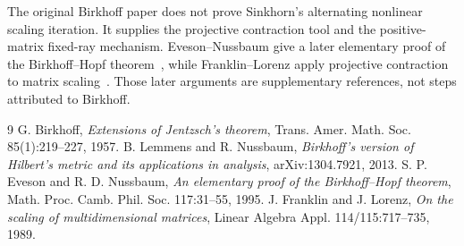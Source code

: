 \documentclass[11pt]{article}
\begin{document}
The original Birkhoff paper does not prove Sinkhorn's alternating nonlinear scaling iteration.  It supplies the projective contraction tool and the positive-matrix fixed-ray mechanism.  Eveson--Nussbaum give a later elementary proof of the Birkhoff--Hopf theorem~\cite{EvesonNussbaum1995}, while Franklin--Lorenz apply projective contraction to matrix scaling~\cite{FranklinLorenz1989}.  Those later arguments are supplementary references, not steps attributed to Birkhoff.

\begin{thebibliography}{9}
 G. Birkhoff, \emph{Extensions of Jentzsch's theorem}, Trans. Amer. Math. Soc. 85(1):219--227, 1957.
 B. Lemmens and R. Nussbaum, \emph{Birkhoff's version of Hilbert's metric and its applications in analysis}, arXiv:1304.7921, 2013.
 S. P. Eveson and R. D. Nussbaum, \emph{An elementary proof of the Birkhoff--Hopf theorem}, Math. Proc. Camb. Phil. Soc. 117:31--55, 1995.
 J. Franklin and J. Lorenz, \emph{On the scaling of multidimensional matrices}, Linear Algebra Appl. 114/115:717--735, 1989.
\end{thebibliography}
\end{document}

